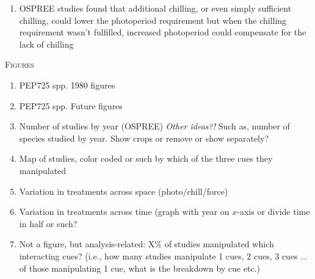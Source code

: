 \documentclass[11pt,letterpaper]{article}
\renewcommand{\section}[1]{%
\bigskip
\begin{center}
\begin{Large}
\normalfont\scshape #1
\medskip
\end{Large}
\end{center}}
\begin{document}
\begin{enumerate}
\item OSPREE studies found that additional chilling, or even simply sufficient chilling, could lower the photoperiod requirement but when the chilling requirement wasn't fulfilled, increased photoperiod could compensate for the lack of chilling \citep{Nienstaedt:1966aa,Myking:1995,Falusi:1996aa,Hawkins:2012}
\end{enumerate}


\newpage
\section{Figures}
\begin{enumerate}
\item PEP725 spp. 1980 figures
\item PEP725 spp. Future figures
\item Number of studies by year (OSPREE) \emph{Other ideas?!} Such as, number of species studied by year. Show crops or remove or show separately?
\item Map of studies, color coded or such by which of the three cues they manipulated
\item Variation in treatments across space (photo/chill/force)
\item Variation in treatments across time (graph with year on $x$-axis or divide time in half or such? 
\item Not a figure, but analysis-related: X\% of studies manipulated which interacting cues? (i.e., how many studies manipulate 1 cues, 2 cues, 3 cues ... of those manipulating 1 cue, what is the breakdown by cue etc.)
\end{enumerate}




\end{document}
